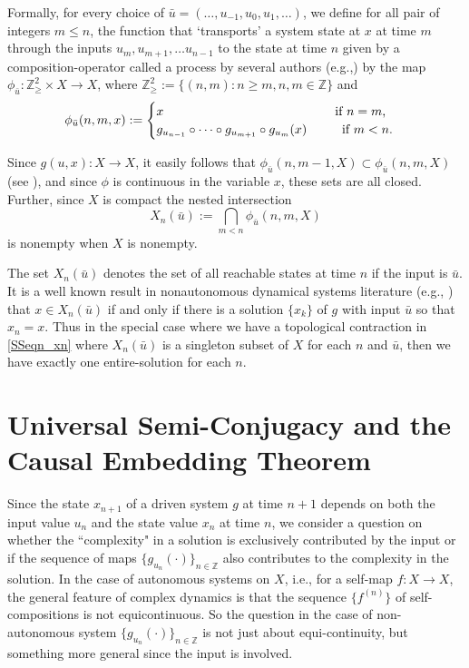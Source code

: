 \documentclass[12 pt]{article}
\begin{document}
Formally, for every choice of  $\bar{u} = (\ldots,u_{-1},u_0,u_1,\ldots)$, we define for all pair of integers $m\le n$, the function that `transports' a system state at $x$ at time $m$ through the inputs $u_{m}, u_{m+1}, \dots u_{n-1}$ 
to the state at time $n$ given by a composition-operator called a process by several authors (e.g.,\cite{kloeden2011nonautonomous}) by the map $\phi_{\bar{u}}: \mathbb{Z}^2_{\ge} \times X \to X$, where $\mathbb{Z}^2_{\ge} := \{ (n,m) : n \ge m, n,m \in \mathbb{Z} \}$ and
\begin{align} \label{eq_Process}
  \phi_{\bar{u}}(n,m,x) := \begin{cases}
        x \quad \quad \quad \quad \quad \quad \quad \text\quad \quad \quad \quad \quad \quad \:\text{ if $n=m$,}
        \\
        g_{u_{n-1}}\circ \cdots \circ g_{u_{m+1}} \circ g_{u_{m}}(x)  \quad \: \: \: \: \;\;\text{ if }  m< n.
        \end{cases}
\end{align} 

Since $g(u,x):X \to X$,  it easily follows that $\phi_{\bar{u}}(n,m-1,X) \subset \phi_{\bar{u}}(n,m,X)$ (see \cite{Manju_ESP} \cite{manjunath2020stability}), and since $\phi$ is continuous in the variable $x$, these sets are all closed. Further, since $X$ is compact the nested intersection  \begin{equation} \label{SSeqn_xn}
X_n(\bar{u}) := \bigcap_{m<n} \phi_{\bar{u}}(n,m,X)
\end{equation}
is nonempty when $X$ is nonempty. 

The set $X_n(\bar{u})$ denotes the set of all reachable states at time $n$ if the input is $\bar{u}$. It is a well known result in nonautonomous dynamical systems literature (e.g., \cite{kloeden2011nonautonomous,Manju_ESP,manjunath2014dynamics}) that  $x\in X_n(\bar{u})$ if and only if there is a solution $\{x_k\}$ of $g$ with input $\bar{u}$ so that $x_n = x$. Thus in the special case where we have a topological contraction in \eqref{SSeqn_xn} where $X_n(\bar{u})$ is a singleton subset of $X$ for each $n$ and $\bar{u}$, then we have exactly one entire-solution for each $n$. 


\section{Universal Semi-Conjugacy and the Causal Embedding Theorem}
Since the state $x_{n+1}$ of a driven system $g$ at time $n+1$ depends on both the input value $u_n$ and the state value $x_n$ at time $n$, we consider a question on whether the ``complexity" in a solution is exclusively contributed by the input or if the sequence of maps $\{g_{u_{n}}(\cdot)\}_{n\in \mathbb{Z}}$ also contributes to the complexity in the solution. In the case of autonomous systems on $X$, i.e., for a self-map $f:X \to X$, the general feature of complex dynamics is that the sequence $\{f^{(n)} \}$ of self-compositions is not equicontinuous. So the question in the case of non-autonomous system $\{g_{u_{n}}(\cdot)\}_{n\in \mathbb{Z}}$ is not just about equi-continuity, but something more general since the input is involved. 
\end{document}
